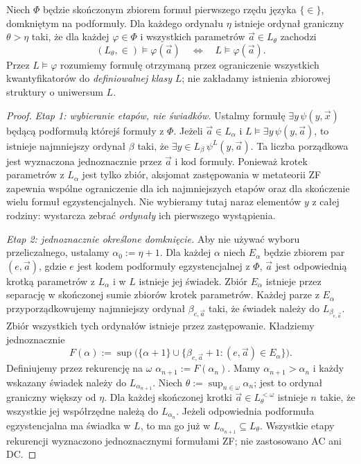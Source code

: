 \begin{lemat}
\label{lem:l-finite-reflection}
Niech $\Phi$ będzie skończonym zbiorem formuł pierwszego
rzędu języka $\{\in\}$, domkniętym na podformuły.
Dla każdego ordynału $\eta$ istnieje ordynał graniczny
$\theta>\eta$ taki, że dla każdej $\varphi\in\Phi$
i wszystkich parametrów $\vec a\in L_\theta$ zachodzi
\[
(L_\theta,\in)\models\varphi(\vec a)
\quad\Longleftrightarrow\quad L\models\varphi(\vec a).
\]
Przez $L\models\varphi$ rozumiemy formułę otrzymaną
przez ograniczenie wszystkich kwantyfikatorów do
\emph{definiowalnej klasy} $L$; nie zakładamy istnienia
zbiorowej struktury o uniwersum $L$.
\end{lemat}
\begin{proof}
\emph{Etap 1: wybieranie etapów, nie świadków.}
Ustalmy formułę $\exists y\,\psi(y,\vec x)$ będącą
podformułą którejś formuły z $\Phi$. Jeżeli
$\vec a\in L_\alpha$ i $L\models\exists y\,\psi(y,\vec a)$,
to istnieje najmniejszy ordynał $\beta$ taki, że
$\exists y\in L_\beta\,\psi^L(y,\vec a)$.
Ta liczba porządkowa jest wyznaczona jednoznacznie
przez $\vec a$ i kod formuły. Ponieważ krotek
parametrów z $L_\alpha$ jest tylko zbiór,
aksjomat zastępowania w metateorii ZF zapewnia
wspólne ograniczenie dla ich najmniejszych etapów
oraz dla skończenie wielu formuł egzystencjalnych.
Nie wybieramy tutaj naraz elementów $y$ z całej rodziny:
wystarcza zebrać \emph{ordynały} ich pierwszego wystąpienia.

\emph{Etap 2: jednoznacznie określone domknięcie.}
Aby nie używać wyboru przeliczalnego,
ustalamy $\alpha_0:=\eta+1$.
Dla każdej $\alpha$ niech $E_\alpha$
będzie zbiorem par $(e,\vec a)$,
gdzie $e$ jest kodem podformuły
egzystencjalnej z $\Phi$,
$\vec a$ jest odpowiednią krotką
parametrów z $L_\alpha$ i w $L$
istnieje jej świadek.
Zbiór $E_\alpha$ istnieje przez
separację w skończonej sumie
zbiorów krotek parametrów.
Każdej parze z $E_\alpha$
przyporządkowujemy najmniejszy
ordynał $\beta_{e,\vec a}$ taki,
że świadek należy do
$L_{\beta_{e,\vec a}}$.
Zbiór wszystkich tych ordynałów
istnieje przez zastępowanie.
Kładziemy jednoznacznie
\[
F(\alpha):=
\sup\bigl(\{\alpha+1\}
 \cup\{\beta_{e,\vec a}+1:
                  (e,\vec a)\in E_\alpha\}\bigr).
\]
Definiujemy przez rekurencję na $\omega$
$\alpha_{n+1}:=F(\alpha_n)$.
Mamy $\alpha_{n+1}>\alpha_n$
i każdy wskazany świadek należy do
$L_{\alpha_{n+1}}$.
Niech $\theta:=\sup_{n\in\omega}\alpha_n$;
jest to ordynał graniczny większy od $\eta$.
Dla każdej skończonej krotki
$\vec a\in L_\theta^{<\omega}$
istnieje $n$ takie, że
wszystkie jej współrzędne należą
do $L_{\alpha_n}$.
Jeżeli odpowiednia podformuła
egzystencjalna ma świadka w $L$,
to ma go już w
$L_{\alpha_{n+1}}\subseteq L_\theta$.
Wszystkie etapy rekurencji
wyznaczono jednoznacznymi formułami ZF;
nie zastosowano AC ani DC.


\end{proof}
